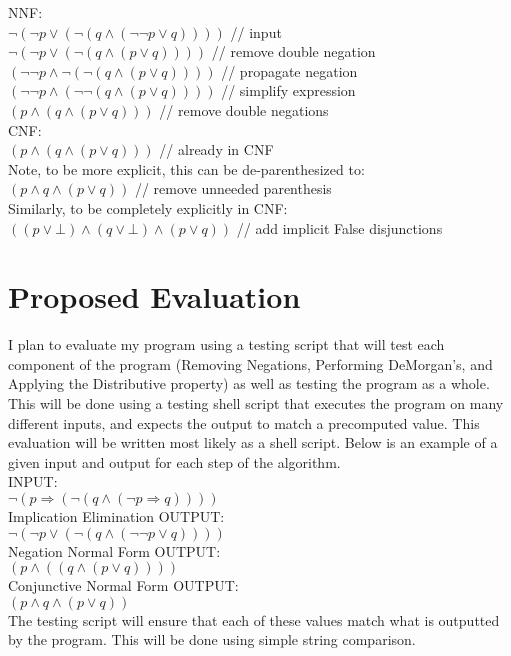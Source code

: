 \documentclass[12pt]{report}
\begin{document}
\noindent NNF:\\
$\lnot (\lnot p \lor (\lnot (q \land (\lnot \lnot p \lor q))))$     // input \\
$\lnot (\lnot p \lor (\lnot (q \land (p \lor q))))$                 // remove double negation\\
$(\lnot \lnot p \land \lnot (\lnot (q \land (p \lor q))))$          // propagate negation\\
$(\lnot \lnot p \land (\lnot \lnot (q \land (p \lor q))))$          // simplify expression\\
$(p \land (q \land (p \lor q)))$                                    // remove double negations\\

\noindent CNF:\\
$(p \land (q \land (p \lor q)))$                                    // already in CNF\\
Note, to be more explicit, this can be de-parenthesized to:\\   
$(p \land q \land (p \lor q))$                                      // remove unneeded parenthesis\\
Similarly, to be completely explicitly in CNF:\\
$((p \lor \bot) \land (q \lor \bot) \land (p \lor q))$              // add implicit False disjunctions\\

\section*{Proposed Evaluation}
I plan to evaluate my program using a testing script that will test  each component of the program (Removing Negations, Performing DeMorgan's, and Applying the Distributive property) as well as testing the program as a whole. This will be done using a testing shell script that executes the program on many different inputs, and expects the output to match a precomputed value. This evaluation will be written most likely as a shell script. Below is an example of a given input and output for each step of the algorithm.\\

\noindent INPUT:\\
\noindent $\lnot(p\Rightarrow (\lnot(q \land (\lnot p \Rightarrow q))))$\\

\noindent Implication Elimination OUTPUT:\\
\noindent $\lnot (\lnot p \lor (\lnot (q \land (\lnot \lnot p \lor q))))$\\

\noindent Negation Normal Form OUTPUT:\\
\noindent $(p \land ((q \land (p \lor q))))$\\

\noindent Conjunctive Normal Form OUTPUT:\\
\noindent $(p \land q \land (p \lor q))$\\

\noindent The testing script will ensure that each of these values match what is outputted by the program. This will be done using simple string comparison.
\end{document}

